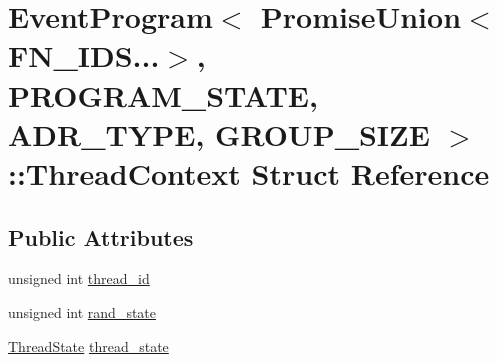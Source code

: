 \hypertarget{structEventProgram_3_01PromiseUnion_3_01FN__IDS_8_8_8_4_00	PROGRAM__STATE_00	ADR__TYPE_00	GROUP__SIZE_01_4_1_1ThreadContext}{\section{Event\-Program$<$ Promise\-Union$<$ F\-N\-\_\-\-I\-D\-S...$>$, P\-R\-O\-G\-R\-A\-M\-\_\-\-S\-T\-A\-T\-E, A\-D\-R\-\_\-\-T\-Y\-P\-E, G\-R\-O\-U\-P\-\_\-\-S\-I\-Z\-E $>$\-:\-:Thread\-Context Struct Reference}
\label{structEventProgram_3_01PromiseUnion_3_01FN__IDS_8_8_8_4_00	PROGRAM__STATE_00	ADR__TYPE_00	GROUP__SIZE_01_4_1_1ThreadContext}
}
\subsection*{Public Attributes}
\begin{DoxyCompactItemize}
\item 
unsigned int \hyperlink{structEventProgram_3_01PromiseUnion_3_01FN__IDS_8_8_8_4_00	PROGRAM__STATE_00	ADR__TYPE_00	GROUP__SIZE_01_4_1_1ThreadContext_afe8f5fc14d20d4dc1b2da494485a5355}{thread\-\_\-id}
\item 
unsigned int \hyperlink{structEventProgram_3_01PromiseUnion_3_01FN__IDS_8_8_8_4_00	PROGRAM__STATE_00	ADR__TYPE_00	GROUP__SIZE_01_4_1_1ThreadContext_af96dccea8ba70d9bbf84dbffa232eb6e}{rand\-\_\-state}
\item 
\hyperlink{structEventProgram_3_01PromiseUnion_3_01FN__IDS_8_8_8_4_00	PROGRAM__STATE_00	ADR__TYPE_00	GROUP__SIZE_01_4_a3b3cb1ee25305cab8a19656538f3d2d6}{Thread\-State} \hyperlink{structEventProgram_3_01PromiseUnion_3_01FN__IDS_8_8_8_4_00	PROGRAM__STATE_00	ADR__TYPE_00	GROUP__SIZE_01_4_1_1ThreadContext_aae34c4ce5b6ebc86fc95bed11f56186b}{thread\-\_\-state}
\end{DoxyCompactItemize}


